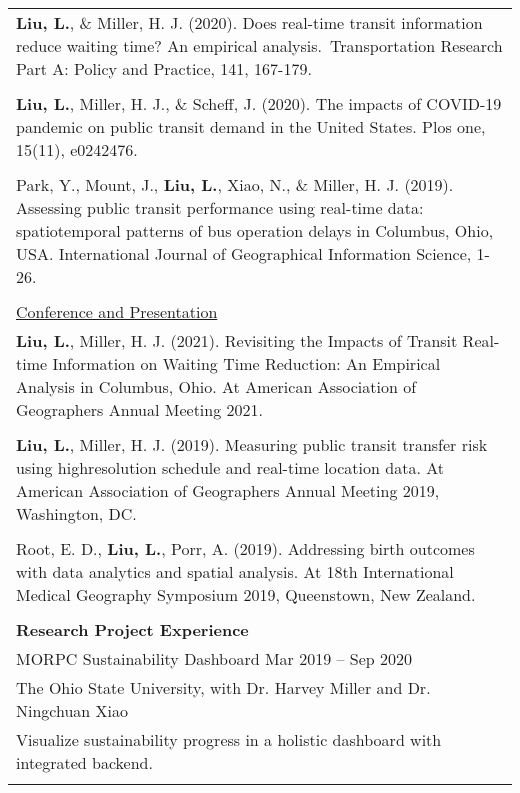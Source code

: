\documentclass[letterpaper, 11pt]{article}
\begin{document}
\begin{longtable}{p{6.5in}}
\textbf{Liu, L.}, \&  Miller, H. J. (2020). Does real-time transit information reduce waiting time? An empirical analysis. Transportation Research Part A: Policy and Practice, 141, 167-179.\\\\

\textbf{Liu, L.}, Miller, H. J., \& Scheff, J. (2020). The impacts of COVID-19 pandemic on public transit demand in the United States. Plos one, 15(11), e0242476.\\\\

Park, Y., Mount, J., \textbf{Liu, L.}, Xiao, N., \& Miller, H. J. (2019). Assessing public transit performance using real-time data: spatiotemporal patterns of bus operation delays in Columbus, Ohio, USA. International Journal of Geographical Information Science, 1-26.\\\\

\underline{Conference and Presentation} \\
\textbf{Liu, L.}, Miller, H. J. (2021). Revisiting the Impacts of Transit Real-time Information on Waiting Time Reduction: An Empirical Analysis in Columbus, Ohio. At American Association of Geographers Annual Meeting 2021.	\\\\

\textbf{Liu, L.}, Miller, H. J. (2019). Measuring public transit transfer risk using highresolution schedule and real-time location data. At American Association of Geographers Annual Meeting 2019, Washington, DC. \\\\

Root, E. D., \textbf{Liu, L.}, Porr, A. (2019). Addressing birth outcomes with data analytics and spatial analysis. At 18th International Medical Geography Symposium 2019, Queenstown, New Zealand.	\\\\


\nohyphens{\textbf{Research Project Experience}} \\
MORPC Sustainability Dashboard \hfill Mar 2019 -- Sep 2020 \\
The Ohio State University, with Dr. Harvey Miller and Dr. Ningchuan Xiao \\
Visualize sustainability progress in a holistic dashboard with integrated backend. \\\\


\end{longtable}
\end{document}
